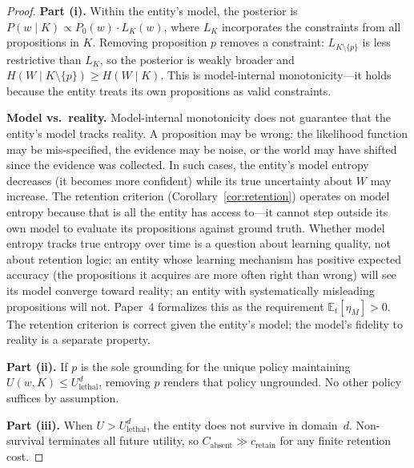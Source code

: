 \documentclass[11pt]{article}
\theoremstyle{definition}
\theoremstyle{remark}
\begin{document}
\begin{proof}
\textbf{Part (i).} Within the entity's model, the posterior is
$P(w \mid K) \propto P_0(w) \cdot L_K(w)$, where $L_K$ incorporates the
constraints from all propositions in $K$. Removing proposition $p$
removes a constraint: $L_{K \setminus \{p\}}$ is less restrictive than
$L_K$, so the posterior is weakly broader and $H(W \mid K \setminus
\{p\}) \geq H(W \mid K)$. This is model-internal monotonicity---it
holds because the entity treats its own propositions as valid
constraints.

\textbf{Model vs.\ reality.} Model-internal monotonicity does not
guarantee that the entity's model tracks reality. A proposition may be
wrong: the likelihood function may be mis-specified, the evidence may be
noise, or the world may have shifted since the evidence was collected.
In such cases, the entity's model entropy decreases (it becomes more
confident) while its true uncertainty about $W$ may increase. The
retention criterion (Corollary~\ref{cor:retention}) operates on model
entropy because that is all the entity has access to---it cannot step
outside its own model to evaluate its propositions against ground truth.
Whether model entropy tracks true entropy over time is a question about
learning quality, not about retention logic: an entity whose learning
mechanism has positive expected accuracy (the propositions it acquires
are more often right than wrong) will see its model converge toward
reality; an entity with systematically misleading propositions will not.
Paper~4 \cite{McCarthy2026d} formalizes this as the requirement
$\mathbb{E}_t[\eta_M] > 0$.
The retention criterion is correct given the entity's model; the model's
fidelity to reality is a separate property.

\textbf{Part (ii).} If $p$ is the sole grounding for the unique
policy maintaining $U(w, K) \leq U_{\text{lethal}}^d$, removing $p$
renders that policy ungrounded. No other policy suffices by assumption.

\textbf{Part (iii).} When $U > U_{\text{lethal}}^d$, the entity does
not survive in domain~$d$. Non-survival terminates all future utility,
so $C_{\text{absent}} \gg c_{\text{retain}}$ for any finite retention
cost.
\end{proof}
\end{document}
